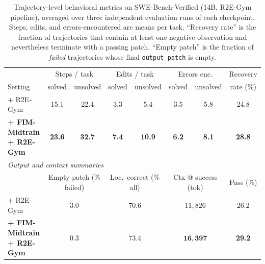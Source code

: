 \begin{table}[h]
\centering
\caption{Trajectory-level behavioral metrics on SWE-Bench-Verified (14B,
R2E-Gym pipeline), averaged over three independent evaluation runs of each
checkpoint. Steps, edits, and errors-encountered are means per task.
``Recovery rate'' is the fraction of trajectories that contain at least one
negative observation and nevertheless terminate with a passing patch.
``Empty patch'' is the fraction of \emph{failed} trajectories whose final
\texttt{output\_patch} is empty.}
\label{tab:behavior}
\small
\setlength{\tabcolsep}{4pt}
\begin{tabular}{l c c c c c c c}
\toprule
& \multicolumn{2}{c}{Steps / task}
& \multicolumn{2}{c}{Edits / task}
& \multicolumn{2}{c}{Errors enc.}
& Recovery \\
\cmidrule(lr){2-3}\cmidrule(lr){4-5}\cmidrule(lr){6-7}
Setting & solved & unsolved & solved & unsolved & solved & unsolved & rate (\%) \\
\midrule
+ R2E-Gym
  & 15.1 & 22.4 & 3.3 & 5.4 & 3.5 & 5.8 & 24.8 \\
\textbf{+ FIM-Midtrain + R2E-Gym}
  & \textbf{23.6} & \textbf{32.7} & \textbf{7.4} & \textbf{10.9}
  & \textbf{6.2} & \textbf{8.1} & \textbf{28.8} \\
\midrule
\multicolumn{8}{l}{\textit{Output and context summaries}} \\
\midrule
& \multicolumn{2}{c}{Empty patch (\% failed)}
& \multicolumn{2}{c}{Loc.\ correct (\% all)}
& \multicolumn{2}{c}{Ctx @ success (tok)}
& Pass (\%) \\
\cmidrule(lr){2-3}\cmidrule(lr){4-5}\cmidrule(lr){6-7}
+ R2E-Gym
  & \multicolumn{2}{c}{$3.0$} & \multicolumn{2}{c}{$70.6$}
  & \multicolumn{2}{c}{$11{,}826$} & 26.2 \\
\textbf{+ FIM-Midtrain + R2E-Gym}
  & \multicolumn{2}{c}{$\mathbf{0.3}$} & \multicolumn{2}{c}{$\mathbf{73.4}$}
  & \multicolumn{2}{c}{$\mathbf{16{,}397}$} & \textbf{29.2} \\
\bottomrule
\end{tabular}
\end{table}

